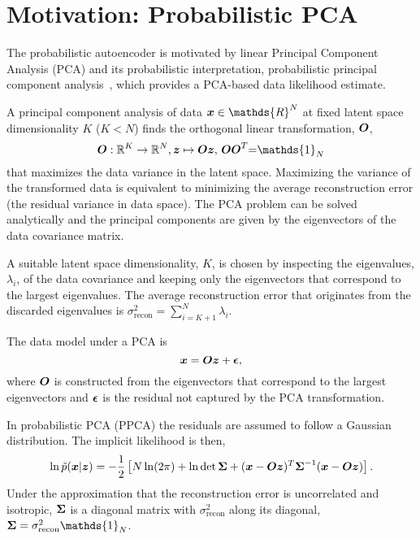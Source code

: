 \documentclass[10pt]{article} \usepackage[accepted]{tmlr}
\def\bi#1{\hbox{\boldmath{$#1$}}}
\begin{document}
\section{Motivation: Probabilistic PCA}
\label{sec:PPCA}
The probabilistic autoencoder is motivated by linear Principal Component Analysis (PCA) and its probabilistic interpretation, probabilistic principal component analysis~\citep{TippingBishop1999}, which provides a PCA-based data likelihood estimate. 

A principal component analysis of data $\bi{x}\in \mathds{R}^N$ at fixed latent space dimensionality $K$ ($K{<}N$) finds the orthogonal linear transformation, $\bi{O}$,
\begin{equation}
    \bi{O}: \mathbb{R}^K \to \mathbb{R}^N, \bi{z} \mapsto \bi{O}\bi{z},\, \bi{O}\bi{O}^T{=}\mathds{1}_N
\end{equation}
that maximizes the data variance in the latent space. Maximizing the variance of the transformed data is equivalent to minimizing the average reconstruction error (the residual variance in data space). The PCA problem can be solved analytically and the principal components are given by the eigenvectors of the data covariance matrix.

A suitable latent space dimensionality, $K$, is chosen by inspecting the eigenvalues, $\lambda_i$, of the data covariance and keeping only the eigenvectors that correspond to the largest eigenvalues. The average reconstruction error that originates from the discarded eigenvalues is $\sigma_{\mathrm{recon}}^2{=}\sum_{i=K+1}^N \lambda_i$.

The data model under a PCA is
\begin{equation}
    \bi{x}=\bi{O}\bi{z}+\bi{\epsilon},
\end{equation} where $\bi{O}$ is constructed from the eigenvectors that correspond to the largest eigenvectors and $\bi{\epsilon}$ is the residual not captured by the PCA transformation.


In probabilistic PCA (PPCA) the residuals are assumed to follow a Gaussian distribution. The implicit likelihood is then,
\begin{equation}
\label{eq:GaussLikelihood}
    \ln \tilde{p}(\bi{x}|\bi{z}) = -\frac{1}{2}\left[N \ln(2\pi)+\ln \det{\bi{\Sigma}} + (\bi{x}-\bi{O}\bi{z})^T \bi{\Sigma}^{-1} (\bi{x}-\bi{O}\bi{z})\right].
\end{equation}
Under the approximation that the reconstruction error is uncorrelated and isotropic, $\bi{\Sigma}$ is a diagonal matrix with $\sigma_{\mathrm{recon}}^2$ along its diagonal, $\bi{\Sigma} = \sigma_{\mathrm{recon}}^2 {\mathds{1}}_N$.  
\end{document}
